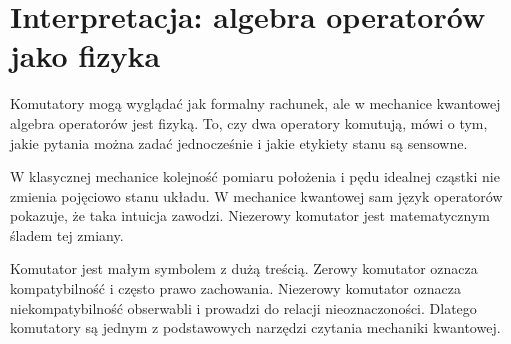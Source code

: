 \section{Interpretacja: algebra operatorów jako fizyka}

Komutatory mogą wyglądać jak formalny rachunek, ale w mechanice kwantowej algebra operatorów jest fizyką. To, czy dwa operatory komutują, mówi o tym, jakie pytania można zadać jednocześnie i jakie etykiety stanu są sensowne.

W klasycznej mechanice kolejność pomiaru położenia i pędu idealnej cząstki nie zmienia pojęciowo stanu układu. W mechanice kwantowej sam język operatorów pokazuje, że taka intuicja zawodzi. Niezerowy komutator jest matematycznym śladem tej zmiany.

\begin{summarybox}
Komutator jest małym symbolem z dużą treścią. Zerowy komutator oznacza kompatybilność i często prawo zachowania. Niezerowy komutator oznacza niekompatybilność obserwabli i prowadzi do relacji nieoznaczoności. Dlatego komutatory są jednym z podstawowych narzędzi czytania mechaniki kwantowej.
\end{summarybox}
